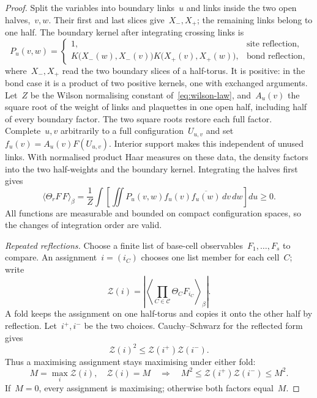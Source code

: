 \begin{proof}
Split the variables into boundary links~$u$ and links inside the two open halves,~$v,w$. Their first and last slices give~$X_-,X_+$; the remaining links belong to one half.
The boundary kernel after integrating crossing links is
\begin{equation*}
 P_u(v,w)=
 \begin{cases}
 1,&\text{site reflection},\\
 K\bigl(X_-(w),X_-(v)\bigr)
 K\bigl(X_+(v),X_+(w)\bigr),&\text{bond reflection},
 \end{cases}
\end{equation*}
where~$X_-,X_+$ read the two boundary slices of a half-torus.
It is positive: in the bond case it is a product of two positive kernels, one with exchanged arguments.
Let~$Z$ be the Wilson normalising constant of~\eqref{eq:wilson-law}, and~$A_u(v)$ the square root of the weight of links and plaquettes in one open half, including half of every boundary factor. The two square roots restore each full factor.
Complete~$u,v$ arbitrarily to a full configuration~$U_{u,v}$ and set~$f_u(v)=A_u(v)F(U_{u,v})$. Interior support makes this independent of unused links.
With normalised product Haar measures on these data, the density factors into the two half-weights and the boundary kernel. Integrating the halves first gives
\begin{equation}\label{eq:iv-boundary-form}
 \langle\Theta_rF\,F\rangle_\beta
 =\frac{1}{Z}\int
 \left[\iint P_u(v,w)f_u(v)\overline{f_u(w)}\,dv\,dw\right]du\ge0.
\end{equation}
All functions are measurable and bounded on compact configuration spaces, so the changes of integration order are valid.

\emph{Repeated reflections.}
Choose a finite list of base-cell observables~$F_1,\ldots,F_s$ to compare. An assignment~$i=(i_C)$ chooses one list member for each cell~$C$; write
\begin{equation*}
 \mathcal Z(i)=\left|\left\langle\prod_{C\in\mathcal C}\Theta_C F_{i_C}\right\rangle_\beta\right|.
\end{equation*}
A fold keeps the assignment on one half-torus and copies it onto the other half by reflection.
Let~$i^+,i^-$ be the two choices.
Cauchy--Schwarz for the reflected form gives
\begin{equation}\label{eq:iv-fold}
 \mathcal Z(i)^2\le \mathcal Z(i^+)\mathcal Z(i^-).
\end{equation}
Thus a maximising assignment stays maximising under either fold:
\begin{equation*}
 M=\max_i \mathcal Z(i),\quad \mathcal Z(i)=M
 \quad\Longrightarrow\quad
 M^2\le \mathcal Z(i^+)\mathcal Z(i^-)\le M^2.
\end{equation*}
If~$M=0$, every assignment is maximising; otherwise both factors equal~$M$.


\end{proof}
